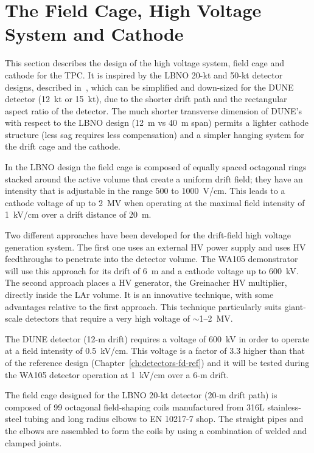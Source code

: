 \section{The Field Cage, High Voltage System and Cathode} 
\label{sec:detectors-fd-alt-hv}

This section describes the design of the high voltage system, field
cage and cathode for the TPC.  It is inspired by the LBNO 20-kt and
50-kt detector designs, described in~\cite{cdr-annex-lbno-2}, which can
be simplified and down-sized for the DUNE detector (12~kt or 15~kt),
due to the shorter drift path and the rectangular aspect ratio of the
detector. The much shorter transverse dimension of DUNE's with respect
to the LBNO design (12~m vs 40~m span)  permits a lighter cathode structure (less sag
requires less compensation) and a simpler hanging system for the drift
cage and the cathode.

In the LBNO design the field cage is composed of equally spaced
octagonal rings stacked around the active volume 
that create a uniform drift field; they have an intensity 
 that is adjustable in the range 500 to 1000~V/cm. This
leads to a cathode voltage of up to 2~MV when operating at the maximal field 
intensity of 1~kV/cm over a drift distance of 20~m.

Two different approaches have been developed for the drift-field high voltage
generation system. 
The first one uses an external HV power supply and uses
HV feedthroughs to penetrate into the detector volume. The WA105
demonstrator will use this approach for its drift of 6~m and a cathode
voltage up to 600~kV.  The second approach places a HV generator, the Greinacher HV
multiplier, directly inside the LAr volume. It is an innovative technique, with some advantages
relative to the first approach. This technique particularly suits
giant-scale detectors that require a very high voltage of
$\sim$1--2~MV.

The DUNE detector (12-m drift) requires a voltage of 600~kV in order
to operate at a field intensity of 0.5~kV/cm. This voltage is a factor
of 3.3 higher than that of the reference design
(Chapter~\ref{ch:detectors-fd-ref}) and it will be tested during the
WA105 detector operation at 1~kV/cm over a 6-m drift.

The field cage designed for the LBNO 20-kt detector (20-m drift path)
is composed of 99 octagonal field-shaping coils manufactured from 316L
stainless-steel tubing and long radius elbows to EN 10217-7 shop.  The
straight pipes and the elbows are assembled to form the coils
by using a combination of welded and clamped joints.

